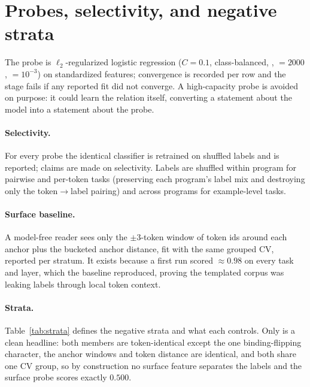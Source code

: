 \section{Probes, selectivity, and negative strata}
\label{app:strata}
The probe is $\ell_2$-regularized logistic regression ($C{=}0.1$, class-balanced,
, $=2000$, $=10^{-3}$) on standardized
features; convergence is recorded per row and the stage fails if any reported fit
did not converge. A high-capacity probe is avoided on purpose: it could learn the
relation itself, converting a statement about the model into a statement about the
probe.

\paragraph{Selectivity.} For every probe the identical classifier is retrained on
shuffled labels and  is
reported; claims are made on selectivity. Labels are shuffled within program for
pairwise and per-token tasks (preserving each program's label mix and destroying
only the token$\to$label pairing) and across programs for example-level tasks.

\paragraph{Surface baseline.} A model-free reader sees only the $\pm 3$-token
window of token ids around each anchor plus the bucketed anchor distance, fit with
the same grouped CV, reported per stratum. It exists because a first run scored
$\approx 0.98$ on every task and layer, which the baseline reproduced, proving the
templated corpus was leaking labels through local token context.

\paragraph{Strata.} Table~\ref{tab:strata} defines the negative strata and what
each controls. Only \cm{} is a clean headline: both members are token-identical
except the one binding-flipping character, the anchor windows and token distance
are identical, and both share one CV group, so by construction no surface feature
separates the labels and the surface probe scores exactly $0.500$.

